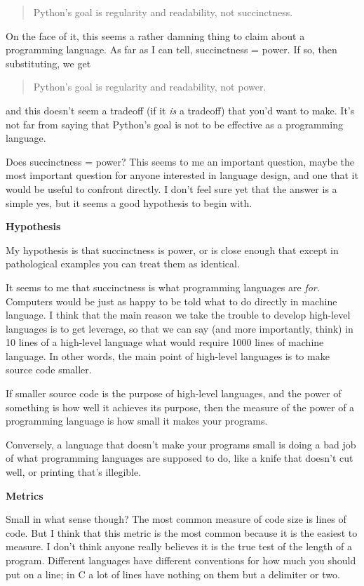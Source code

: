 \documentclass[12pt]{book}
\begin{document}
\begin{quote}
Python's goal is regularity and readability, not succinctness.
\end{quote}

On the face of it, this seems a rather damning thing to claim about a
programming language. As far as I can tell, succinctness = power. If so,
then substituting, we get

\begin{quote}
Python's goal is regularity and readability, not power.
\end{quote}

and this doesn't seem a tradeoff (if it \emph{is} a tradeoff) that you'd
want to make. It's not far from saying that Python's goal is not to be
effective as a programming language.

Does succinctness = power? This seems to me an important question, maybe
the most important question for anyone interested in language design,
and one that it would be useful to confront directly. I don't feel sure
yet that the answer is a simple yes, but it seems a good hypothesis to
begin with.

\textbf{Hypothesis}

My hypothesis is that succinctness is power, or is close enough that
except in pathological examples you can treat them as identical.

It seems to me that succinctness is what programming languages are
\emph{for.} Computers would be just as happy to be told what to do
directly in machine language. I think that the main reason we take the
trouble to develop high-level languages is to get leverage, so that we
can say (and more importantly, think) in 10 lines of a high-level
language what would require 1000 lines of machine language. In other
words, the main point of high-level languages is to make source code
smaller.

If smaller source code is the purpose of high-level languages, and the
power of something is how well it achieves its purpose, then the measure
of the power of a programming language is how small it makes your
programs.

Conversely, a language that doesn't make your programs small is doing a
bad job of what programming languages are supposed to do, like a knife
that doesn't cut well, or printing that's illegible.

\textbf{Metrics}

Small in what sense though? The most common measure of code size is
lines of code. But I think that this metric is the most common because
it is the easiest to measure. I don't think anyone really believes it is
the true test of the length of a program. Different languages have
different conventions for how much you should put on a line; in C a lot
of lines have nothing on them but a delimiter or two.
\end{document}
